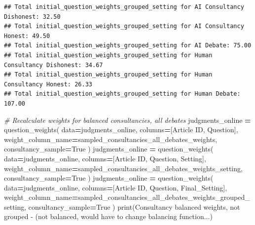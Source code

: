 \documentclass[
]{article}
\newenvironment{Shaded}{\begin{snugshade}}{\end{snugshade}}
\newcommand{\BuiltInTok}[1]{#1}
\newcommand{\CommentTok}[1]{\textcolor[rgb]{0.56,0.35,0.01}{\textit{#1}}}
\newcommand{\NormalTok}[1]{#1}
\newcommand{\OperatorTok}[1]{\textcolor[rgb]{0.81,0.36,0.00}{\textbf{#1}}}
\newcommand{\StringTok}[1]{\textcolor[rgb]{0.31,0.60,0.02}{#1}}
\newcommand{\VariableTok}[1]{\textcolor[rgb]{0.00,0.00,0.00}{#1}}
\begin{document}
\begin{verbatim}
## Total initial_question_weights_grouped_setting for AI Consultancy Dishonest: 32.50
## Total initial_question_weights_grouped_setting for AI Consultancy Honest: 49.50
## Total initial_question_weights_grouped_setting for AI Debate: 75.00
## Total initial_question_weights_grouped_setting for Human Consultancy Dishonest: 34.67
## Total initial_question_weights_grouped_setting for Human Consultancy Honest: 26.33
## Total initial_question_weights_grouped_setting for Human Debate: 107.00
\end{verbatim}

\begin{Shaded}
\begin{Highlighting}[]
\CommentTok{\# Recalculate weights for balanced consultancies, all debates}
\NormalTok{judgments\_online }\OperatorTok{=}\NormalTok{ question\_weights(}
\NormalTok{    data}\OperatorTok{=}\NormalTok{judgments\_online, }
\NormalTok{    columns}\OperatorTok{=}\NormalTok{[}\StringTok{\textquotesingle{}Article ID\textquotesingle{}}\NormalTok{, }\StringTok{\textquotesingle{}Question\textquotesingle{}}\NormalTok{], }
\NormalTok{    weight\_column\_name}\OperatorTok{=}\StringTok{\textquotesingle{}sampled\_consultancies\_all\_debates\_weights\textquotesingle{}}\NormalTok{,}
\NormalTok{    consultancy\_sample}\OperatorTok{=}\VariableTok{True}
\NormalTok{)}
\NormalTok{judgments\_online }\OperatorTok{=}\NormalTok{ question\_weights(}
\NormalTok{    data}\OperatorTok{=}\NormalTok{judgments\_online, }
\NormalTok{    columns}\OperatorTok{=}\NormalTok{[}\StringTok{\textquotesingle{}Article ID\textquotesingle{}}\NormalTok{, }\StringTok{\textquotesingle{}Question\textquotesingle{}}\NormalTok{, }\StringTok{\textquotesingle{}Setting\textquotesingle{}}\NormalTok{], }
\NormalTok{    weight\_column\_name}\OperatorTok{=}\StringTok{\textquotesingle{}sampled\_consultancies\_all\_debates\_weights\_setting\textquotesingle{}}\NormalTok{,}
\NormalTok{    consultancy\_sample}\OperatorTok{=}\VariableTok{True}
\NormalTok{)}
\NormalTok{judgments\_online }\OperatorTok{=}\NormalTok{ question\_weights(}
\NormalTok{    data}\OperatorTok{=}\NormalTok{judgments\_online, }
\NormalTok{    columns}\OperatorTok{=}\NormalTok{[}\StringTok{\textquotesingle{}Article ID\textquotesingle{}}\NormalTok{, }\StringTok{\textquotesingle{}Question\textquotesingle{}}\NormalTok{, }\StringTok{\textquotesingle{}Final\_Setting\textquotesingle{}}\NormalTok{], }
\NormalTok{    weight\_column\_name}\OperatorTok{=}\StringTok{\textquotesingle{}sampled\_consultancies\_all\_debates\_weights\_grouped\_setting\textquotesingle{}}\NormalTok{,}
\NormalTok{    consultancy\_sample}\OperatorTok{=}\VariableTok{True}
\NormalTok{)}
\BuiltInTok{print}\NormalTok{(}\StringTok{\textquotesingle{}Consultancy balanced weights, not grouped {-} (not balanced, would have to change balancing function...\textquotesingle{}}\NormalTok{)}
\end{Highlighting}
\end{Shaded}
\end{document}
